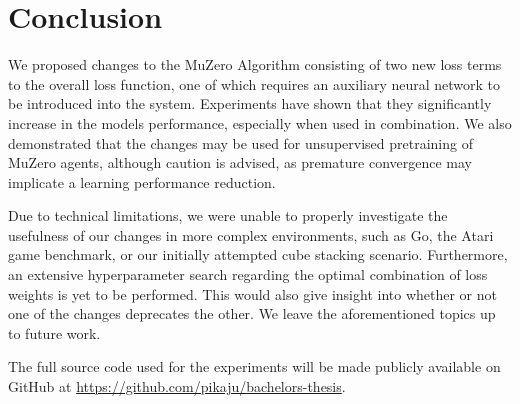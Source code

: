 \section{Conclusion}
We proposed changes to the MuZero Algorithm consisting of two new loss terms to the overall loss function, one of which requires an auxiliary neural network to be introduced into the system. Experiments have shown that they significantly increase in the models performance, especially when used in combination. We also demonstrated that the changes may be used for unsupervised pretraining of MuZero agents, although caution is advised, as premature convergence may implicate a learning performance reduction.

Due to technical limitations, we were unable to properly investigate the usefulness of our changes in more complex environments, such as Go, the Atari game benchmark, or our initially attempted cube stacking scenario. Furthermore, an extensive hyperparameter search regarding the optimal combination of loss weights is yet to be performed. This would also give insight into whether or not one of the changes deprecates the other. We leave the aforementioned topics up to future work.

The full source code used for the experiments will be made publicly available on GitHub at \url{https://github.com/pikaju/bachelors-thesis}.